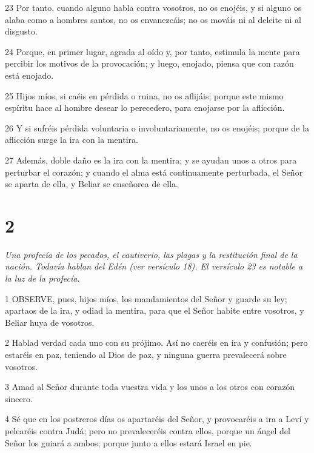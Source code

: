 \par 23 Por tanto, cuando alguno habla contra vosotros, no os enojéis, y si alguno os alaba como a hombres santos, no os envanezcáis; no os mováis ni al deleite ni al disgusto.

\par 24 Porque, en primer lugar, agrada al oído y, por tanto, estimula la mente para percibir los motivos de la provocación; y luego, enojado, piensa que con razón está enojado.

\par 25 Hijos míos, si caéis en pérdida o ruina, no os aflijáis; porque este mismo espíritu hace al hombre desear lo perecedero, para enojarse por la aflicción.

\par 26 Y si sufréis pérdida voluntaria o involuntariamente, no os enojéis; porque de la aflicción surge la ira con la mentira.

\par 27 Además, doble daño es la ira con la mentira; y se ayudan unos a otros para perturbar el corazón; y cuando el alma está continuamente perturbada, el Señor se aparta de ella, y Beliar se enseñorea de ella.



\chapter{2}

\par \textit{Una profecía de los pecados, el cautiverio, las plagas y la restitución final de la nación. Todavía hablan del Edén (ver versículo 18). El versículo 23 es notable a la luz de la profecía.}

\par 1 OBSERVE, pues, hijos míos, los mandamientos del Señor y guarde su ley; apartaos de la ira, y odiad la mentira, para que el Señor habite entre vosotros, y Beliar huya de vosotros.

\par 2 Hablad verdad cada uno con su prójimo. Así no caeréis en ira y confusión; pero estaréis en paz, teniendo al Dios de paz, y ninguna guerra prevalecerá sobre vosotros.

\par 3 Amad al Señor durante toda vuestra vida y los unos a los otros con corazón sincero.

\par 4 Sé que en los postreros días os apartaréis del Señor, y provocaréis a ira a Leví y pelearéis contra Judá; pero no prevaleceréis contra ellos, porque un ángel del Señor los guiará a ambos; porque junto a ellos estará Israel en pie.

